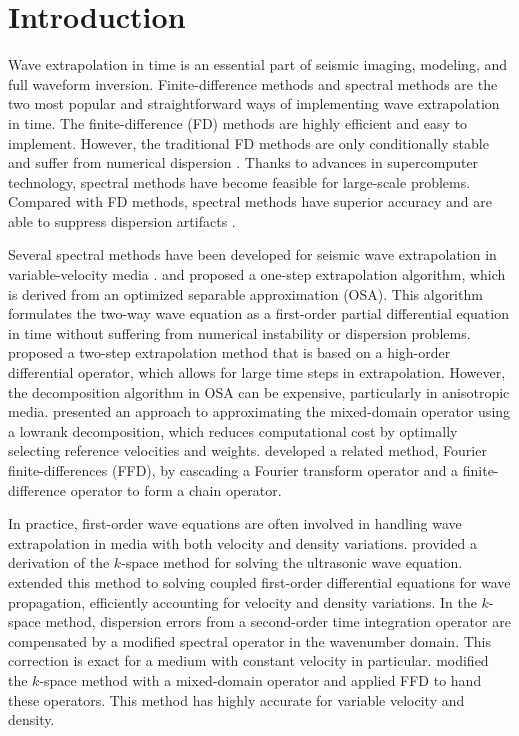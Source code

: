 \section{Introduction}

Wave extrapolation in time is an essential part of seismic imaging, modeling, and full waveform inversion. Finite-difference methods \cite[]{etgen86, wu1996} and spectral methods \cite[]{tal,pseudo} are the two most popular and straightforward ways of implementing wave extrapolation in time. The finite-difference (FD) methods are highly efficient and easy to implement. However, the traditional FD methods are only conditionally stable and suffer from numerical dispersion \cite[]{kastner}. Thanks to advances in supercomputer technology, spectral methods have become feasible for large-scale problems. Compared with FD methods, spectral methods have superior accuracy and are able to suppress dispersion artifacts \cite[]{etgen09}.

Several spectral methods have been developed for seismic wave extrapolation in variable-velocity media \cite[]{fowler2010,dux}. \cite{zhang07} and \cite{zhang09} proposed a one-step extrapolation algorithm, which is  derived from an optimized separable approximation (OSA). This algorithm formulates the two-way wave equation as a first-order partial differential equation in time without suffering from numerical instability or dispersion problems. \cite{yu} proposed a two-step extrapolation method that is based on a high-order differential operator, which allows for large time steps in extrapolation. However, the decomposition algorithm in OSA can be expensive, particularly in anisotropic media. \cite{fomellowrankgp} presented an approach to approximating the mixed-domain operator using a lowrank decomposition, which reduces computational cost by optimally selecting reference velocities and weights. \cite{songx}  developed a related method, Fourier finite-differences (FFD),  by cascading a Fourier transform operator and a finite-difference operator to form a chain operator. 

In practice, first-order wave equations are often involved in handling wave extrapolation in media with both velocity and density variations. \cite{mast} provided a derivation of the $k$-space method for solving the ultrasonic wave equation. \cite{tabei} extended this method to solving coupled first-order differential equations for wave propagation, efficiently accounting for velocity and density variations. In the $k$-space method, dispersion errors from a second-order time integration operator are compensated by a modified spectral operator in the wavenumber domain. This correction is exact for a medium with constant velocity in particular. \cite{songffd} modified the $k$-space method with a mixed-domain operator and applied FFD to hand these operators. This method has highly accurate for variable velocity and density. 

